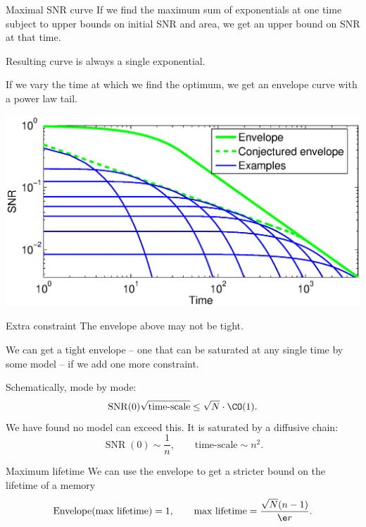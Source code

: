 \documentclass[final,hyperref={pdfpagelabels=false,bookmarks=false}]{beamer}
\DeclareMathOperator{\SNR}{SNR}
\begin{document}
\begin{frame}{}
\begin{columns}[t]
\begin{column}{0.32\linewidth}
\begin{block}{Maximal SNR curve}
 \vp If we find the maximum sum of exponentials \alert{at one time} subject to upper bounds on initial SNR and area,
 we get an upper bound on SNR at that time.

 \vp Resulting curve is always a single exponential.

 \vp If we vary the time at which we find the optimum, we get an envelope curve with a power law tail.
 \begin{center}
 \includegraphics[width=15cm]{env.eps}
 \end{center}
%
\end{block}


\begin{block}{Extra constraint}
%
 The envelope above may not be tight.

 \vp We can get a tight envelope
 -- one that can be saturated at any single time by some model --
 if we add one more constraint.

 \vp Schematically, mode by mode:
 \begin{equation*}
   \SNR(0)\sqrt{\text{time-scale}} \leq \sqrt{N}\cdot \CO(1).
 \end{equation*}
 We have found no model can exceed this. It is saturated by a diffusive chain:
 \begin{equation*}
   \SNR(0) \sim \frac{1}{n},
   \qquad
   \text{time-scale} \sim n^2.
 \end{equation*}
%
\end{block}


\begin{block}{Maximum lifetime}
%
 We can use the envelope to get a stricter bound on the lifetime of a memory
 \begin{equation*}
 \begin{aligned}
   \operatorname{Envelope}(\text{max lifetime}) = 1, \qquad
   \text{max lifetime}  = \frac{\sqrt{N}(n-1)}{\e r}.
 \end{aligned}
 \end{equation*}
%
\end{block}


\end{column}
\end{columns}
\end{frame}
\end{document}

